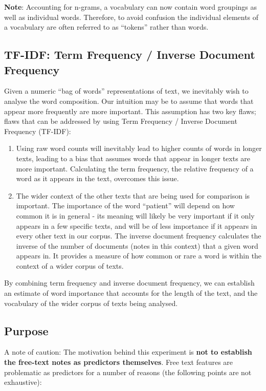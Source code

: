    \textbf{Note}: Accounting for n-grams, a vocabulary can now contain word groupings as well as individual words. Therefore, to avoid confusion the individual elements of a vocabulary are often referred to as ``tokens'' rather than words.

   \subsection{TF-IDF: Term Frequency / Inverse Document Frequency}\label{subsec:tf-idf:-term-frequency-/-inverse-document-frequency}

   Given a numeric ``bag of words'' representations of text, we inevitably wish to analyse the word composition. Our intuition may be to assume that words that appear more frequently are more important. This assumption has two key flaws; flaws that can be addressed by using Term Frequency / Inverse Document Frequency (TF-IDF):

   \begin{enumerate}
       \item Using raw word counts will inevitably lead to higher counts of words in longer texts, leading to a bias that assumes words that appear in longer texts are more important. Calculating the term frequency, the relative frequency of a word as it appears in the text, overcomes this issue.
       \item The wider context of the other texts that are being used for comparison is important. The importance of the word ``patient'' will depend on how common it is in general - its meaning will likely be very important if it only appears in a few specific texts, and will be of less importance if it appears in every other text in our corpus. The inverse document frequency calculates the inverse of the number of documents (notes in this context) that a given word appears in. It provides a measure of how common or rare a word is within the context of a wider corpus of texts.
   \end{enumerate}

   By combining term frequency and inverse document frequency, we can establish an estimate of word importance that accounts for the length of the text, and the vocabulary of the wider corpus of texts being analysed.

   \subsection{Purpose}

   A note of caution: The motivation behind this experiment is \textbf{not to establish the free-text notes as predictors themselves}. Free text features are problematic as predictors for a number of reasons (the following points are not exhaustive):

